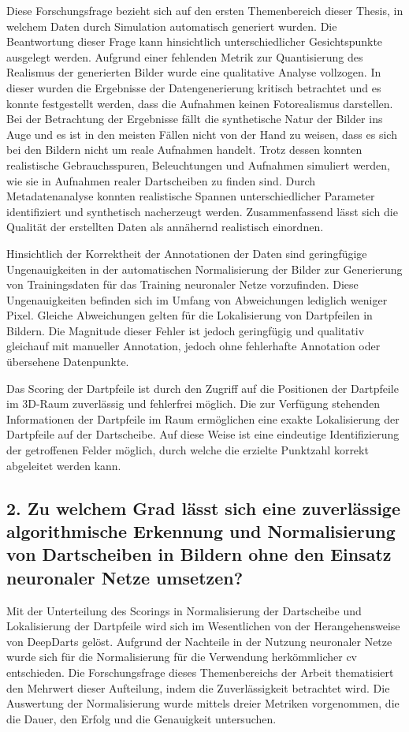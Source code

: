 Diese Forschungsfrage bezieht sich auf den ersten Themenbereich dieser Thesis, in welchem Daten durch Simulation automatisch generiert wurden. Die Beantwortung dieser Frage kann hinsichtlich unterschiedlicher Gesichtspunkte ausgelegt werden. Aufgrund einer fehlenden Metrik zur Quantisierung des Realismus der generierten Bilder wurde eine qualitative Analyse vollzogen. In dieser wurden die Ergebnisse der Datengenerierung kritisch betrachtet und es konnte festgestellt werden, dass die Aufnahmen keinen Fotorealismus darstellen. Bei der Betrachtung der Ergebnisse fällt die synthetische Natur der Bilder ins Auge und es ist in den meisten Fällen nicht von der Hand zu weisen, dass es sich bei den Bildern nicht um reale Aufnahmen handelt. Trotz dessen konnten realistische Gebrauchsspuren, Beleuchtungen und Aufnahmen simuliert werden, wie sie in Aufnahmen realer Dartscheiben zu finden sind. Durch Metadatenanalyse konnten realistische Spannen unterschiedlicher Parameter identifiziert und synthetisch nacherzeugt werden. Zusammenfassend lässt sich die Qualität der erstellten Daten als annähernd realistisch einordnen.

Hinsichtlich der Korrektheit der Annotationen der Daten sind geringfügige Ungenauigkeiten in der automatischen Normalisierung der Bilder zur Generierung von Trainingsdaten für das Training neuronaler Netze vorzufinden. Diese Ungenauigkeiten befinden sich im Umfang von Abweichungen lediglich weniger Pixel. Gleiche Abweichungen gelten für die Lokalisierung von Dartpfeilen in Bildern. Die Magnitude dieser Fehler ist jedoch geringfügig und qualitativ gleichauf mit manueller Annotation, jedoch ohne fehlerhafte Annotation oder übersehene Datenpunkte.

Das Scoring der Dartpfeile ist durch den Zugriff auf die Positionen der Dartpfeile im 3D-Raum zuverlässig und fehlerfrei möglich. Die zur Verfügung stehenden Informationen der Dartpfeile im Raum ermöglichen eine exakte Lokalisierung der Dartpfeile auf der Dartscheibe. Auf diese Weise ist eine eindeutige Identifizierung der getroffenen Felder möglich, durch welche die erzielte Punktzahl korrekt abgeleitet werden kann.

\subsection*{2. Zu welchem Grad lässt sich eine zuverlässige algorithmische Erkennung und Normalisierung von Dartscheiben in Bildern ohne den Einsatz neuronaler Netze umsetzen?}

Mit der Unterteilung des Scorings in Normalisierung der Dartscheibe und Lokalisierung der Dartpfeile wird sich im Wesentlichen von der Herangehensweise von DeepDarts gelöst. Aufgrund der Nachteile in der Nutzung neuronaler Netze wurde sich für die Normalisierung für die Verwendung herkömmlicher \ac{cv} entschieden. Die Forschungsfrage dieses Themenbereichs der Arbeit thematisiert den Mehrwert dieser Aufteilung, indem die Zuverlässigkeit betrachtet wird. Die Auswertung der Normalisierung wurde mittels dreier Metriken vorgenommen, die die Dauer, den Erfolg und die Genauigkeit untersuchen.


